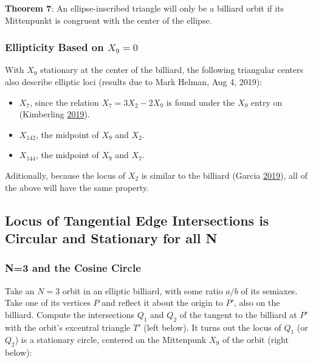 \documentclass[]{article}
\providecommand{\tightlist}{%
  \setlength{\itemsep}{0pt}\setlength{\parskip}{0pt}}
\begin{document}
\textbf{Theorem 7}: An ellipse-inscribed triangle will only be a billiard orbit if its Mittenpunkt is congruent with the center of the ellipse.

\hypertarget{ellipticity-based-on-x_90}{%
\subsubsection{\texorpdfstring{Ellipticity Based on \(X_9=0\)}{Ellipticity Based on X\_9=0}}\label{ellipticity-based-on-x_90}}

With \(X_9\) stationary at the center of the billiard, the following triangular centers also describe elliptic loci (results due to Mark Helman, Aug 4, 2019):

\begin{itemize}
\tightlist
\item
  \(X_7\), since the relation \(X_7=3X_2-2X_9\) is found under the \(X_9\) entry on (Kimberling \protect\hyperlink{ref-etc}{2019}).
\item
  \(X_{142}\), the midpoint of \(X_9\) and \(X_2\).
\item
  \(X_{144}\), the midpoint of \(X_9\) and \(X_7\).
\end{itemize}

Aditionally, because the locus of \(X_2\) is similar to the billiard (Garcia \protect\hyperlink{ref-ronaldo19}{2019}), all of the above will have the same property.

\hypertarget{locus-of-tangential-edge-intersections-is-circular-and-stationary-for-all-n}{%
\subsection{Locus of Tangential Edge Intersections is Circular and Stationary for all N}\label{locus-of-tangential-edge-intersections-is-circular-and-stationary-for-all-n}}

\hypertarget{n3-and-the-cosine-circle}{%
\subsubsection{N=3 and the Cosine Circle}\label{n3-and-the-cosine-circle}}

Take an \(N=3\) orbit in an elliptic billiard, with some ratio \(a/b\) of its semiaxes. Take one of its vertices \(P\) and reflect it about the origin to \(P'\), also on the billiard. Compute the intersections \(Q_1\) and \(Q_2\) of the tangent to the billiard at \(P'\) with the orbit's excentral triangle \(T'\) (left below). It turns out the locus of \(Q_1\) (or \(Q_2\)) is a stationary circle, centered on the Mittenpunk \(X_9\) of the orbit (right below):
\end{document}
